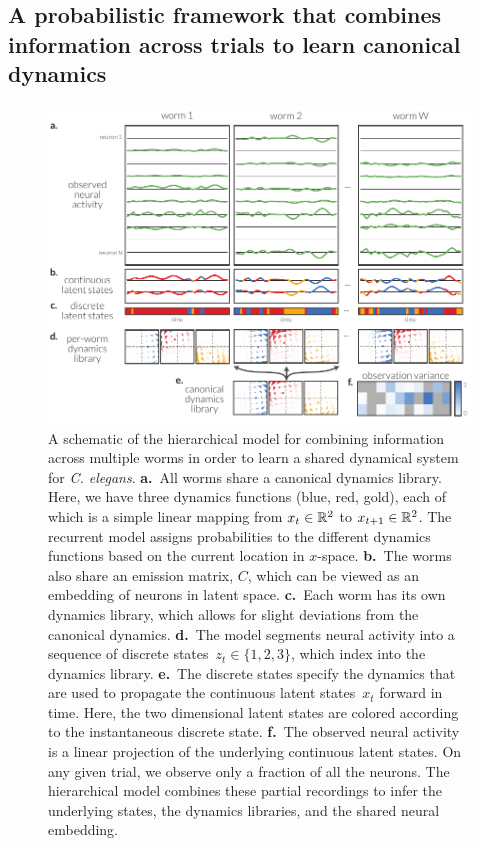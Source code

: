 \documentclass[11pt]{article}
\newcommand{\celegans}{\textit{C. elegans}}
\begin{document}
\subsection*{A probabilistic framework that combines information across
  trials to learn canonical dynamics}

\begin{figure}[ht]
\centering%
\includegraphics[width=6in]{figures/figure1} 
\caption{A schematic of the hierarchical model for combining
  information across multiple worms in order to learn a shared
  dynamical system for \celegans.  \textbf{a.}~All worms share a
  canonical dynamics library. Here, we have three dynamics functions
  (blue, red, gold), each of which is a simple linear mapping from
  $x_t \in \mathbb{R}^2$ to $x_{t+1} \in \mathbb{R}^2$.  The recurrent model
  assigns probabilities to the different dynamics functions based on
  the current location in $x$-space.  \textbf{b.}~The worms also share
  an emission matrix, $C$, which can be viewed as an embedding of
  neurons in latent space.  \textbf{c.}~Each worm has its own dynamics
  library, which allows for slight deviations from the canonical
  dynamics.  \textbf{d.}~The model segments neural activity into a
  sequence of discrete states~$z_{t} \in \{1, 2, 3\}$, which index
  into the dynamics library.  \textbf{e.}~The discrete states specify
  the dynamics that are used to propagate the continuous latent
  states~$x_t$ forward in time. Here, the two dimensional latent
  states are colored according to the instantaneous discrete
  state. \textbf{f.}~The observed neural activity is a linear
  projection of the underlying continuous latent states.  On any given
  trial, we observe only a fraction of all the neurons.  The
  hierarchical model combines these partial recordings to infer the
  underlying states, the dynamics libraries, and the shared neural
  embedding. }
\label{fig:model}
\end{figure}
\end{document}

